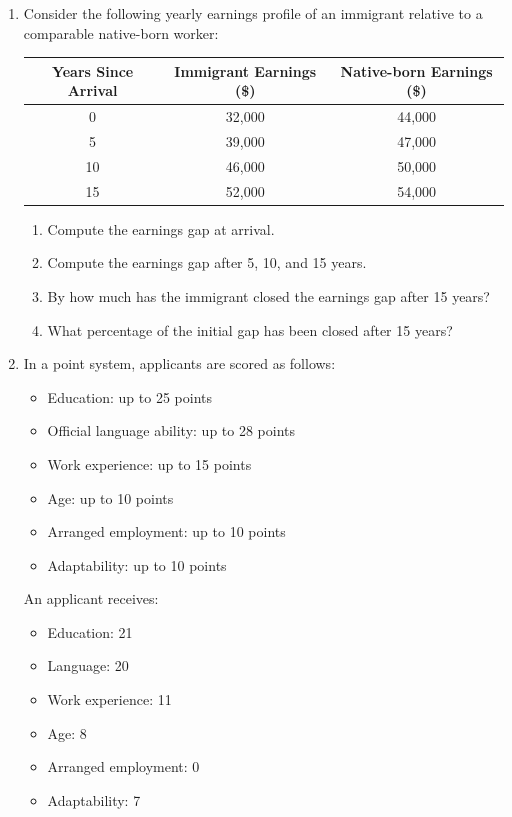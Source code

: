 \documentclass[12pt]{article}
\begin{document}
\begin{enumerate}[label=\textbf{Question \arabic*.}]
\item Consider the following yearly earnings profile of an immigrant relative to a comparable native-born worker:

\begin{center}
\begin{tabular}{ccc}
\toprule
Years Since Arrival & Immigrant Earnings (\$) & Native-born Earnings (\$) \\
\midrule
0 & 32{,}000 & 44{,}000 \\
5 & 39{,}000 & 47{,}000 \\
10 & 46{,}000 & 50{,}000 \\
15 & 52{,}000 & 54{,}000 \\
\bottomrule
\end{tabular}
\end{center}

\begin{enumerate}[label=(\alph*)]
    \item Compute the earnings gap at arrival.
    \item Compute the earnings gap after 5, 10, and 15 years.
    \item By how much has the immigrant closed the earnings gap after 15 years?
    \item What percentage of the initial gap has been closed after 15 years?
\end{enumerate}

\item In a point system, applicants are scored as follows:
\begin{itemize}
    \item Education: up to 25 points
    \item Official language ability: up to 28 points
    \item Work experience: up to 15 points
    \item Age: up to 10 points
    \item Arranged employment: up to 10 points
    \item Adaptability: up to 10 points
\end{itemize}

An applicant receives:
\begin{itemize}
    \item Education: 21
    \item Language: 20
    \item Work experience: 11
    \item Age: 8
    \item Arranged employment: 0
    \item Adaptability: 7
\end{itemize}


\end{enumerate}
\end{document}
